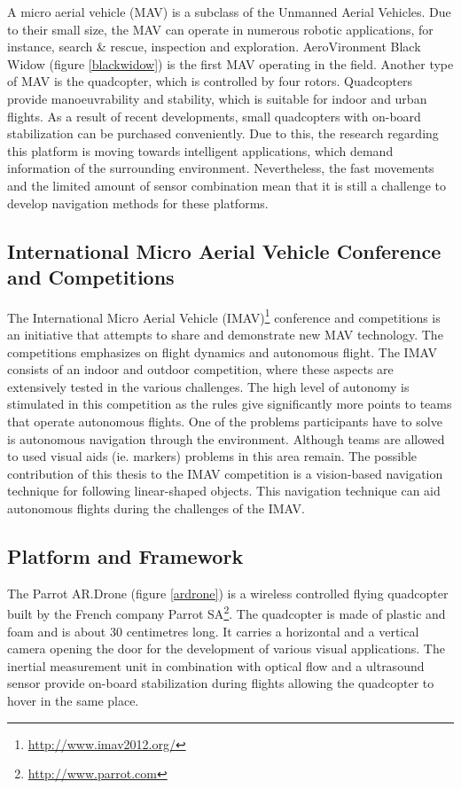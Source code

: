 \documentclass[a4paper]{article}
\begin{document}
A micro aerial vehicle (MAV) is a subclass of the Unmanned Aerial Vehicles. Due to their small size, the MAV can operate in numerous robotic applications, for instance, search \&  rescue, inspection and exploration. AeroVironment Black Widow\cite{Grasmeyer2001} (figure \ref{blackwidow}) is the first MAV operating in the field. Another type of MAV is the quadcopter, which is controlled by four rotors. Quadcopters provide manoeuvrability and stability, which is suitable for indoor and urban flights. As a result of recent developments, small quadcopters with on-board stabilization can be purchased conveniently. Due to this, the research regarding this platform is moving towards intelligent applications, which demand information of the surrounding environment. Nevertheless, the fast movements and the limited amount of sensor combination mean that it is still a challenge to develop navigation methods for these platforms.

\subsection{International Micro Aerial Vehicle Conference and Competitions}
The International Micro Aerial Vehicle (IMAV)\footnote{\url{http://www.imav2012.org/}} conference and competitions is an initiative that attempts to share and demonstrate new MAV technology. The competitions emphasizes on flight dynamics and autonomous flight. The IMAV consists of an indoor and outdoor competition, where these aspects are extensively tested in the various challenges. The high level of autonomy is stimulated in this competition as the rules give significantly more points to teams that operate autonomous flights. One of the problems participants have to solve is autonomous navigation through the environment. Although teams are allowed to used visual aids (ie. markers) problems in this area remain. The possible contribution of this thesis to the IMAV competition is a vision-based navigation technique for following linear-shaped objects. This navigation technique can aid autonomous flights during the challenges of the IMAV.

\subsection{Platform and Framework}
The Parrot AR.Drone (figure \ref{ardrone}) is a wireless controlled flying quadcopter built by the French company Parrot SA\footnote{\url{http://www.parrot.com}}. The quadcopter is made of plastic and foam and is about 30 centimetres long. It carries a horizontal and a vertical camera opening the door for the development of various visual applications. The inertial measurement unit in combination with optical flow and a ultrasound sensor provide on-board stabilization during flights allowing the quadcopter to hover in the same place. 
\end{document}
